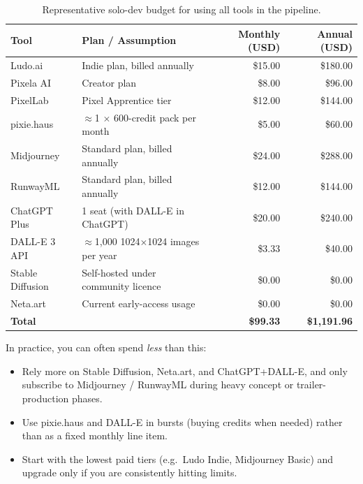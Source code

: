 \documentclass[11pt]{article}
\begin{document}
\begin{table}[h]
    \centering
    \begin{tabular}{p{3.2cm}p{5.3cm}rr}
        \toprule
        \textbf{Tool} & \textbf{Plan / Assumption} & \textbf{Monthly (USD)} & \textbf{Annual (USD)} \\
        \midrule
        Ludo.ai & Indie plan, billed annually & \$15.00 & \$180.00 \\
        Pixela AI & Creator plan & \$8.00 & \$96.00 \\
        PixelLab & Pixel Apprentice tier & \$12.00 & \$144.00 \\
        pixie.haus & $\approx$1 $\times$ 600-credit pack per month & \$5.00 & \$60.00 \\
        Midjourney & Standard plan, billed annually & \$24.00 & \$288.00 \\
        RunwayML & Standard plan, billed annually & \$12.00 & \$144.00 \\
        ChatGPT Plus & 1 seat (with DALL-E in ChatGPT) & \$20.00 & \$240.00 \\
        DALL-E 3 API & $\approx$1{,}000 1024$\times$1024 images per year & \$3.33 & \$40.00 \\
        Stable Diffusion & Self-hosted under community licence & \$0.00 & \$0.00 \\
        Neta.art & Current early-access usage & \$0.00 & \$0.00 \\
        \midrule
        \textbf{Total} & & \textbf{\$99.33} & \textbf{\$1{,}191.96} \\
        \bottomrule
    \end{tabular}
    \caption{Representative solo-dev budget for using all tools in the pipeline.}
    \label{tab:annual-cost}
\end{table}

In practice, you can often spend \emph{less} than this:

\begin{itemize}
    \item Rely more on Stable Diffusion, Neta.art, and ChatGPT+DALL-E, and only subscribe to Midjourney / RunwayML during heavy concept or trailer-production phases.
    \item Use pixie.haus and DALL-E in bursts (buying credits when needed) rather than as a fixed monthly line item.
    \item Start with the lowest paid tiers (e.g.\ Ludo Indie, Midjourney Basic) and upgrade only if you are consistently hitting limits.
\end{itemize}
\end{document}
